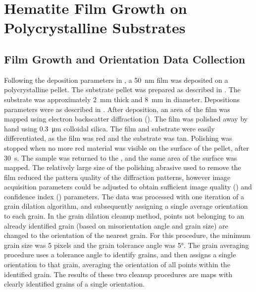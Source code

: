 

\chapter{Hematite Film Growth on Polycrystalline Substrates}
\label{ch:polycrystalline.growth}




\section{Film Growth and Orientation Data Collection}
\label{sec:poly.growth.experimental}


Following the deposition parameters in , a \SI{50}{\nano\meter}
film was deposited on a polycrystalline \sto{} pellet.  The substrate pellet was prepared
as described in . The substrate was approximately
\SI{2}{\milli\meter} thick and \SI{8}{\milli\meter} in diameter. Depositions parameters
were as described in . After deposition, an area of the film was
mapped using electron backscatter diffraction (). The film was polished away by
hand using \SI{0.3}{\micro\meter} colloidal silica. The film and substrate were easily
differentiated, as the film was red and the substrate was tan. Polishing was stopped when
no more red material was visible on the surface of the pellet, after
\texttildelow\SI{30}{\second}. The sample was returned to the , and the same
area of the surface was mapped. The relatively large size of the polishing abrasive used
to remove the film reduced the pattern quality of the diffraction patterns, however image
acquisition parameters could be adjusted to obtain sufficient image quality ()
and confidence index () parameters. The data was processed with one iteration of
a grain dilation algorithm, and subsequently assigning a single average orientation to
each grain. In the grain dilation cleanup method, points not belonging to an already
identified grain (based on misorientation angle and grain size) are changed to the
orientation of the nearest grain.  For this procedure, the minimum grain size was 5 pixels
and the grain tolerance angle was 5\si{\degree}. The grain averaging procedure uses a
tolerance angle to identify grains, and then assigns a single orientation to that grain,
averaging the orientation of all points within the identified grain. The results of these
two cleanup procedures are maps with clearly identified grains of a single orientation.


